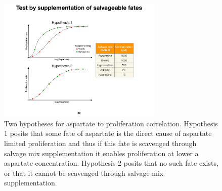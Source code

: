 \begin{figure}
    \centering
    \includegraphics[width=0.70\textwidth]{figures/chap1/asp_fates_suppl_hypo.pdf}
    \caption[Two hypotheses for aspartate to proliferation correlation]{
    Two hypotheses for aspartate to proliferation correlation.
    Hypothesis 1 posits that some fate of aspartate is the direct cause of aspartate limited proliferation and thus if this fate is scavenged through salvage mix supplementation it enables proliferation at lower a aspartate concentration.
    Hypothesis 2 posits that no such fate exists, or that it cannot be scavenged through salvage mix supplementation.
    }
    \label{fig:ch1:asp_fates_suppl_hypo}
\end{figure}





